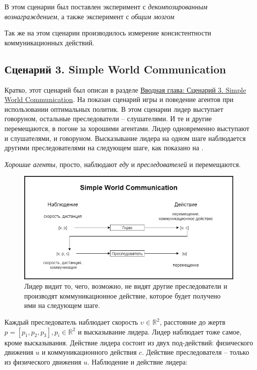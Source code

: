 В этом сценарии был поставлен эксперимент с \textit{декомпозированным вознаграждением}, а также эксперимент с \textit{общим мозгом}

Так же на этом сценарии производилось измерение консистентности коммуникационных действий.

\subsection{Сценарий 3. Simple World Communication} \label{exp-swc}

Кратко, этот сценарий был описан в разделе \hyperref[intro-swc]{Вводная глава: Сценарий 3. Simple World Communication}. На  показан сценарий игры и поведение агентов при использовании оптимальных политик. В этом сценарии лидер выступает говоруном, остальные преследователи – слушателями. И те и другие перемещаются, в погоне за хорошими агентами. Лидер одновременно выступают и слушателями, и говоруном. Высказывание лидера на одном шаге наблюдается другими преследователями на следующем шаге, как показано на .

\textit{Хорошие агенты}, просто, наблюдают \textit{еду} и \textit{преследователей} и перемещаются.

\begin{figure}[ht!]
    \center
    \includegraphics [scale=0.60] {my_folder/images/ch4/simple_world_communication.png}
    \caption{Лидер видит то, чего, возможно, не видят другие преследователи и производят коммуникационное действие, которое будет получено ими на следующем шаге.}
    \label{fig:exp-swc}
\end{figure}

Каждый преследователь наблюдает скорость $\upsilon \in \mathbb{R}^2$, расстояние до жертв $p = [p_1, p_2, p_3], p_i \in \mathbb{R}^2$ и высказывание лидера. Лидер наблюдает тоже самое, кроме высказывания. Действие лидера состоит из двух под-действий: физического движения $u$ и коммуникационного действия $c$. Действие преследователя – только из физического движения $u$.
Наблюдение и действие лидера:


